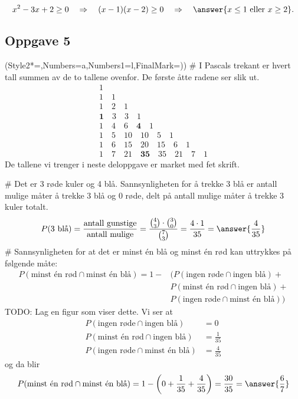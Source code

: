 \begin{equation*}
	x^2 - 3x + 2 \geq 0 
	\quad \Rightarrow \quad ( x - 1)(x - 2) \geq 0
	\quad \Rightarrow \quad \answer{x \leq 1 \text{ eller } x \geq 2}.
\end{equation*}

\subsection*{Oppgave 5}
\begin{easylist}[enumerate]
	\ListProperties(Style2*=,Numbers=a,Numbers1=l,FinalMark={)})
	# I Pascals trekant er hvert tall summen av de to tallene ovenfor.
	De første åtte radene ser slik ut.
	\begin{gather*}
	1 \\
	1 \quad 1 \\
	1 \quad 2 \quad 1 \\
	\textbf{1} \quad 3 \quad 3 \quad 1 \\
	1 \quad 4 \quad 6 \quad \textbf{4} \quad 1  \\
	1 \quad 5 \quad 10 \quad 10 \quad 5 \quad 1  \\
	1 \quad 6 \quad 15 \quad 20 \quad 15 \quad 6 \quad 1 \\
	1 \quad 7 \quad 21 \quad \textbf{35} \quad 35 \quad 21 \quad 7 \quad 1 
	\end{gather*}
	De tallene vi trenger i neste deloppgave er market med fet skrift.
	
	# Det er 3 røde kuler og 4 blå. Sannsynligheten for å trekke 3 blå er antall mulige måter å trekke 3 blå og 0 røde, delt på antall mulige måter å trekke 3 kuler totalt.
	\begin{equation*}
		P(3\text{ blå}) = \frac{\text{antall gunstige}}{\text{antall mulige}}
		= \frac{\binom{4}{3} \cdot \binom{3}{0}}{\binom{7}{3}} = 
		\frac{4 \cdot 1}{35} = \answer{\frac{4}{35}}
	\end{equation*}
	# Sannsynligheten for at det er minst én blå og minst én rød kan uttrykkes på følgende måte:
	\begin{align*}
		P(\text{minst én rød} \cap \text{minst én blå}) = 1 -
		& (P(\text{ingen røde} \cap \text{ingen blå}) + \\
		& P(\text{minst én rød} \cap \text{ingen blå}) + \\
		& P(\text{ingen røde} \cap \text{minst én blå}))
	\end{align*}
	TODO: Lag en figur som viser dette.
	Vi ser at
	\begin{align*}
		P(\text{ingen røde} \cap \text{ingen blå}) &= 0 \\
		P(\text{minst én rød} \cap \text{ingen blå}) &= \frac{1}{35} \\
		P(\text{ingen røde} \cap \text{minst én blå}) &= \frac{4}{35}
	\end{align*}
	og da blir 
	\begin{equation*}
		P(\text{minst én rød} \cap \text{minst én blå}) = 1 -
		\left( 0 + 
		\frac{1}{35} + 
		\frac{4}{35}\right) = \frac{30}{35} = \answer{\frac{6}{7}}
	\end{equation*}
\end{easylist}

